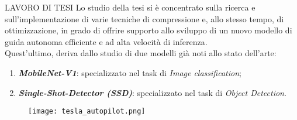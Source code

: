 \begin{frame}{LAVORO DI TESI}
    Lo studio della tesi si è concentrato sulla ricerca e sull'implementazione 
    di varie tecniche di compressione e, allo stesso tempo, di ottimizzazione, 
    in grado di offrire supporto allo sviluppo di un nuovo modello di guida autonoma efficiente e ad alta velocità di inferenza.\\
    \vspace{0.3cm}
    Quest'ultimo, deriva dallo studio di due modelli già noti allo stato dell'arte:
    \begin{minipage}{\linewidth}
        \centering
        \begin{minipage}{0.45\linewidth}
            \begin{enumerate}
                \item {\bfseries{\emph{MobileNet-V1}}}\footnotemark[1]: specializzato nel task di \emph{Image classification};
                \item {\bfseries{\emph{Single-Shot-Detector (SSD)}}}\footnotemark[2]: specializzato nel task di \emph{Object Detection}.
            \end{enumerate}
        \end{minipage}
        \begin{minipage}{0.45\linewidth}
            \begin{figure}
                \centering
                \texttt{[image: tesla\_autopilot.png]}
                \centering
            \end{figure}
        \end{minipage}
    \end{minipage}
\end{frame}